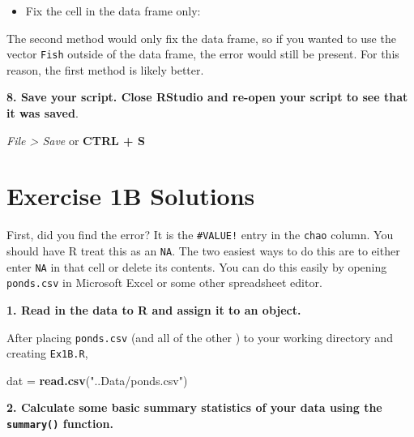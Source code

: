 \documentclass[]{book}
\newenvironment{Shaded}{\begin{snugshade}}{\end{snugshade}}
\newcommand{\KeywordTok}[1]{\textcolor[rgb]{0.13,0.29,0.53}{\textbf{#1}}}
\newcommand{\DecValTok}[1]{\textcolor[rgb]{0.00,0.00,0.81}{#1}}
\newcommand{\StringTok}[1]{\textcolor[rgb]{0.31,0.60,0.02}{#1}}
\newcommand{\OperatorTok}[1]{\textcolor[rgb]{0.81,0.36,0.00}{\textbf{#1}}}
\newcommand{\NormalTok}[1]{#1}
\providecommand{\tightlist}{%
  \setlength{\itemsep}{0pt}\setlength{\parskip}{0pt}}
\theoremstyle{definition}
\theoremstyle{definition}
\theoremstyle{definition}
\theoremstyle{remark}
\begin{document}
\begin{itemize}
\tightlist
\item
  Fix the cell in the data frame only:
\end{itemize}

\begin{Shaded}
\end{Shaded}

The second method would only fix the data frame, so if you wanted to use
the vector \texttt{Fish} outside of the data frame, the error would
still be present. For this reason, the first method is likely better.

\textbf{8. Save your script. Close RStudio and re-open your script to
see that it was saved}.

\emph{File \textgreater{} Save} or \textbf{CTRL + S}

\hypertarget{ex1b-answers}{\section*{Exercise 1B
Solutions}\label{ex1b-answers}}

First, did you find the error? It is the \texttt{\#VALUE!} entry in the
\texttt{chao} column. You should have R treat this as an \texttt{NA}.
The two easiest ways to do this are to either enter \texttt{NA} in that
cell or delete its contents. You can do this easily by opening
\texttt{ponds.csv} in Microsoft Excel or some other spreadsheet editor.

\textbf{1. Read in the data to R and assign it to an object.}

After placing \texttt{ponds.csv} (and all of the other ) to your working
directory and creating \texttt{Ex1B.R},

\begin{Shaded}
\begin{Highlighting}[]
\NormalTok{dat =}\StringTok{ }\KeywordTok{read.csv}\NormalTok{(}\StringTok{"..Data/ponds.csv"}\NormalTok{)}
\end{Highlighting}
\end{Shaded}

\textbf{2. Calculate some basic summary statistics of your data using
the \texttt{summary()} function.}
\end{document}
